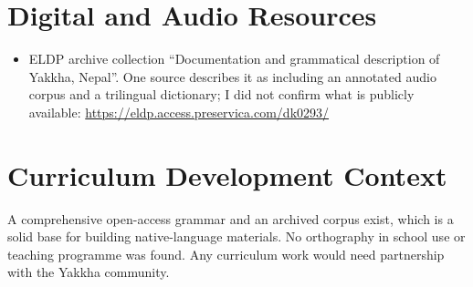 \documentclass[12pt]{article}
\begin{document}
\section{Digital and Audio Resources}
\begin{itemize}
\item ELDP archive collection ``Documentation and grammatical description of Yakkha, Nepal''. One source describes it as including an annotated audio corpus and a trilingual dictionary; I did not confirm what is publicly available: \url{https://eldp.access.preservica.com/dk0293/}
\end{itemize}

\section{Curriculum Development Context}
A comprehensive open-access grammar and an archived corpus exist, which is a solid base for building native-language materials. No orthography in school use or teaching programme was found. Any curriculum work would need partnership with the Yakkha community.
\end{document}
